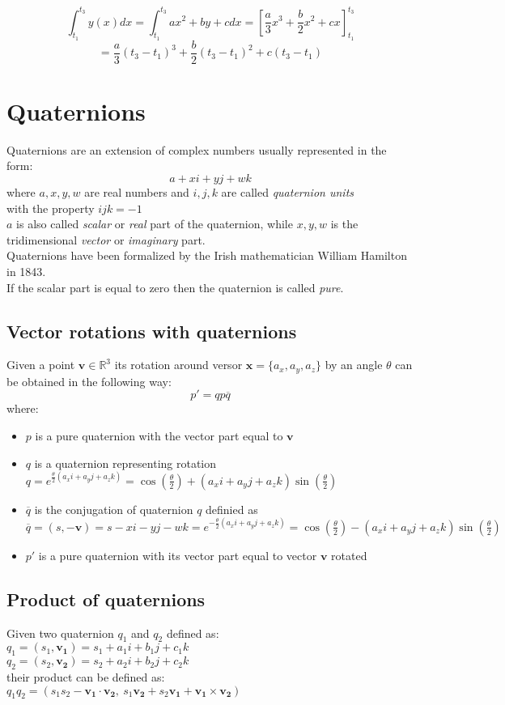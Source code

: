 $$
\int_{t_1}^{t_3} y(x)dx = \int_{t_1}^{t_3} ax^2 + by + c dx = [\frac{a}{3}x^3+\frac{b}{2}x^2+c{x}]_{t_1}^{t_3} 
$$
$$= \frac{a}{3}(t_3-t_1)^3+\frac{b}{2}(t_3-t_1)^2+c(t_3-t_1)$$



\section{Quaternions}
Quaternions are an extension of complex numbers usually represented in the form:
$$ a + xi + yj + wk $$
where $a, x, y, w$ are real numbers and $i, j, k$ are called \textit{quaternion units} \\
with the property ${ijk=-1}$  \\
$a$ is also called \textit{scalar} or \textit{real} part of the quaternion, while $x,y,w$ is the tridimensional \textit{vector} or \textit{imaginary} part. \cite{amslaurea6701} \\
Quaternions have been formalized by the Irish mathematician William Hamilton in 1843. \\
If the scalar part is equal to zero then the quaternion is called \textit{pure}.

\subsection{Vector rotations with quaternions}
Given a point $\boldsymbol{v} \in \mathbb{R}^3$ its rotation around versor $\boldsymbol{x}=\{a_x, a_y, a_z\}$ by an angle $\theta$ can be obtained in the following way:
$$ p' = q p \overline{q}$$
where: \\
\begin{itemize}
\item $p$ is a pure quaternion with the vector part equal to $\boldsymbol{v}$
\item $q$ is a quaternion representing rotation $q=e^{\frac{\theta}{2}(a_x i + a_y j + a_z k)}=\cos(\frac{\theta}{2})+(a_x i + a_y j + a_z k)\sin(\frac{\theta}{2})$ 
\item $\overline{q}$ is the conjugation of quaternion $q$ definied as \\
$\overline{q}=(s,-\boldsymbol{v})=s-xi-yj-wk=e^{-\frac{\theta}{2}(a_x i + a_y j + a_z k)}=\cos(\frac{\theta}{2})-(a_x i + a_y j + a_z k)\sin(\frac{\theta}{2})$
\item $p'$ is a pure quaternion with its vector part equal to vector $\boldsymbol{v}$ rotated
\end{itemize}

\subsection{Product of quaternions}
Given two quaternion $q_1$ and $q_2$ defined as: \\
$q_1 = (s_1,\boldsymbol{v_1})=s_1+a_1i+b_1j+c_1k$ \\
$q_2=(s_2,\boldsymbol{v_2})=s_2+a_2i+b_2j+c_2k$ \\
their product can be defined as: \\
$q_1 q_2 = (s_1 s_2 - \boldsymbol{v_1 \cdot v_2}, \ s_1 \boldsymbol{v_2} + s_2 \boldsymbol{v_1} + \boldsymbol{v_1} \times \boldsymbol{v_2})$

